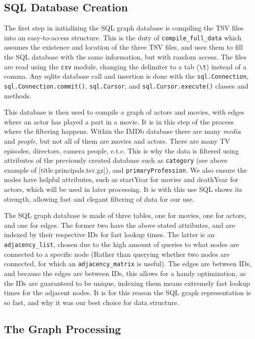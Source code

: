 \documentclass{article}
\begin{document}
\subsection{SQL Database Creation}

The first step in initializing the SQL graph database is compiling the TSV files into an easy-to-access structure. This is the duty of \verb!compile_full_data! which assumes the existence and location of the three TSV files, and uses them to fill the SQL database with the same information, but with random access. The files are read using the \verb!csv! module, changing the delimiter to a tab (\verb!\t!) instead of a comma. Any sqlite database call and insertion is done with the \verb!sql.Connection!, \verb!sql.Connection.commit()!, \verb!sql.Cursor!, and \verb!sql.Cursor.execute()! classes and methods.

This database is then used to compile a graph of actors and movies, with edges where an actor has played a part in a movie. It is in this step of the process where the filtering happens. Within the IMDb database there are many \emph{media} and \emph{people}, but not all of them are movies and actors. There are many TV episodes, directors, camera people, e.t.c. This is why the data is filtered using attributes of the previously created database such as \verb+category+ (see above example of [title.principals.tsv.gz]), and \verb!primaryProfession!. We also ensure the nodes have helpful attributes, such as startYear for movies and deathYear for actors, which will be used in later processing. It is with this use SQL shows its strength, allowing fast and elegant filtering of data for our use.

The SQL graph database is made of three tables, one for movies, one for actors, and one for edges. The former two have the above stated attributes, and are indexed by their respective IDs for fast lookup times. The latter is an \verb+adjacency_list+, chosen due to the high amount of queries to what nodes are connected to a specific node (Rather than querying whether two nodes are connected, for which an \verb+adjacency_matrix+ is useful). The edges are between IDs, and because the edges are between IDs, this allows for a handy optimization, as the IDs are guaranteed to be unique, indexing them means extremely fast lookup times for the adjacent nodes. It is for this reason the SQL graph representation is so fast, and why it was our best choice for data structure.

\subsection{The Graph Processing}
\end{document}
